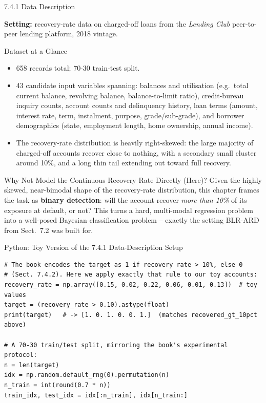 \documentclass[aspectratio=169,10pt]{beamer}
\begin{document}
\begin{frame}[allowframebreaks]{7.4.1 Data Description}

\textbf{Setting:} recovery-rate data on charged-off loans from the \emph{Lending Club} peer-to-peer lending platform, 2018 vintage.

\begin{block}{Dataset at a Glance}
\begin{itemize}
  \item 658 records total; 70-30 train-test split.
  \item 43 candidate input variables spanning: balances and utilisation (e.g.\ total current balance, revolving balance, balance-to-limit ratio), credit-bureau inquiry counts, account counts and delinquency history, loan terms (amount, interest rate, term, instalment, purpose, grade/sub-grade), and borrower demographics (state, employment length, home ownership, annual income).
  \item The recovery-rate distribution is heavily right-skewed: the large majority of charged-off accounts recover close to nothing, with a secondary small cluster around 10\%, and a long thin tail extending out toward full recovery.
\end{itemize}
\end{block}

\framebreak

\begin{block}{Why Not Model the Continuous Recovery Rate Directly (Here)?}
Given the highly skewed, near-bimodal shape of the recovery-rate distribution, this chapter frames the task as \textbf{binary detection}: will the account recover \emph{more than 10\%} of its exposure at default, or not? This turns a hard, multi-modal regression problem into a well-posed Bayesian classification problem -- exactly the setting BLR-ARD from Sect.~7.2 was built for.
\end{block}

\end{frame}

\begin{frame}[fragile]{Python: Toy Version of the 7.4.1 Data-Description Setup}
\begin{lstlisting}[caption={Illustrating the book's binary-target construction on the toy loan dataset}]
# The book encodes the target as 1 if recovery rate > 10%, else 0
# (Sect. 7.4.2). Here we apply exactly that rule to our toy accounts:
recovery_rate = np.array([0.15, 0.02, 0.22, 0.06, 0.01, 0.13])  # toy values
target = (recovery_rate > 0.10).astype(float)
print(target)   # -> [1. 0. 1. 0. 0. 1.]  (matches recovered_gt_10pct above)

# A 70-30 train/test split, mirroring the book's experimental protocol:
n = len(target)
idx = np.random.default_rng(0).permutation(n)
n_train = int(round(0.7 * n))
train_idx, test_idx = idx[:n_train], idx[n_train:]
\end{lstlisting}
\end{frame}
\end{document}

